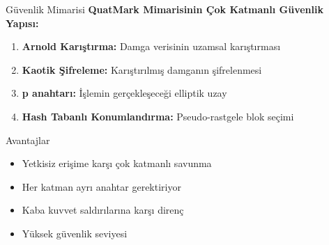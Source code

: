 \documentclass[aspectratio=169,xcolor={dvipsnames}]{beamer}
\begin{document}
\begin{frame}{Güvenlik Mimarisi}
\textbf{QuatMark Mimarisinin Çok Katmanlı Güvenlik Yapısı:}

\begin{enumerate}
\item \textbf{Arnold Karıştırma:} Damga verisinin uzamsal karıştırması
\item \textbf{Kaotik Şifreleme:} Karıştırılmış damganın şifrelenmesi
\item \textbf{p anahtarı:} İşlemin gerçekleşeceği elliptik uzay
\item \textbf{Hash Tabanlı Konumlandırma:} Pseudo-rastgele blok seçimi
\end{enumerate}

\vspace{0.5cm}

\begin{block}{Avantajlar}
\begin{itemize}
\item Yetkisiz erişime karşı çok katmanlı savunma
\item Her katman ayrı anahtar gerektiriyor
\item Kaba kuvvet saldırılarına karşı direnç
\item Yüksek güvenlik seviyesi
\end{itemize}
\end{block}
\end{frame}
\end{document}
